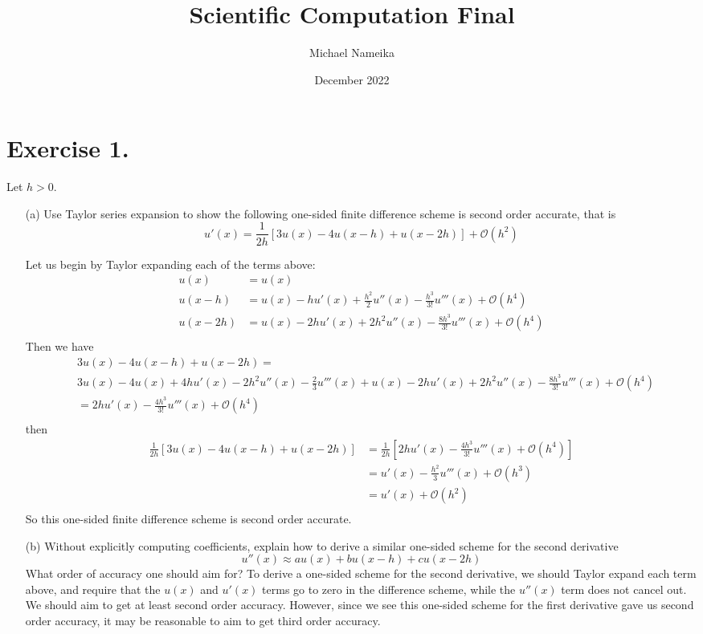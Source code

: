 \documentclass{article}
\title{Scientific Computation Final}
\author{Michael Nameika}
\date{December 2022}
\begin{document}
\maketitle

\section*{Exercise 1.}
Let $h > 0$.
\begin{itemize}
    \item[(a)] Use Taylor series expansion to show the following one-sided finite difference scheme is second order accurate, that is
    \[u'(x) = \frac{1}{2h}[3u(x) - 4u(x - h) + u(x - 2h)] + \mathcal{O}(h^2)\]

    Let us begin by Taylor expanding each of the terms above:
    \begin{align*}
        u(x) &= u(x) \\
        u(x-h) &= u(x) - hu'(x) + \frac{h^2}{2}u''(x) - \frac{h^3}{3!}u'''(x) + \mathcal{O}(h^4) \\
        u(x-2h) &= u(x) - 2hu'(x) + 2h^2u''(x) - \frac{8h^3}{3!}u'''(x) + \mathcal{O}(h^4) \\
    \end{align*}
    Then we have
    \begin{align*}
        &3u(x) - 4u(x-h) + u(x-2h) = \\ 
        &3u(x) -4u(x) + 4hu'(x) - 2h^2u''(x) - \frac{2}{3}u'''(x) + u(x) - 2hu'(x) + 2h^2u''(x) - \frac{8h^3}{3!}u'''(x) + \mathcal{O}(h^4) \\
        &= 2hu'(x) - \frac{4h^3}{3!}u'''(x) + \mathcal{O}(h^4) \\
    \end{align*}
    then 
    \begin{align*}
        \frac{1}{2h}[3u(x) - 4u(x-h) + u(x-2h)] &= \frac{1}{2h}[2hu'(x) - \frac{4h^3}{3!}u'''(x) + \mathcal{O}(h^4)] \\
        &= u'(x) - \frac{h^2}{3}u'''(x) + \mathcal{O}(h^3) \\
        &= u'(x) + \mathcal{O}(h^2) \\
    \end{align*}
    So this one-sided finite difference scheme is second order accurate.
    

    \item[(b)] Without explicitly computing coefficients, explain how to derive a similar one-sided scheme for the second derivative 
    \[u''(x) \approx au(x) + bu(x - h) + cu(x - 2h)\]
    What order of accuracy one should aim for?
    \newline\newline
    To derive a one-sided scheme for the second derivative, we should Taylor expand each term above, and require that the $u(x)$ and $u'(x)$ terms go to zero in the difference scheme, while the $u''(x)$ term does not cancel out. 
    We should aim to get at least second order accuracy. 
    However, since we see this one-sided scheme for the first derivative gave us second order accuracy, it may be reasonable to aim to get third order accuracy.
    
\end{itemize}
\end{document}
